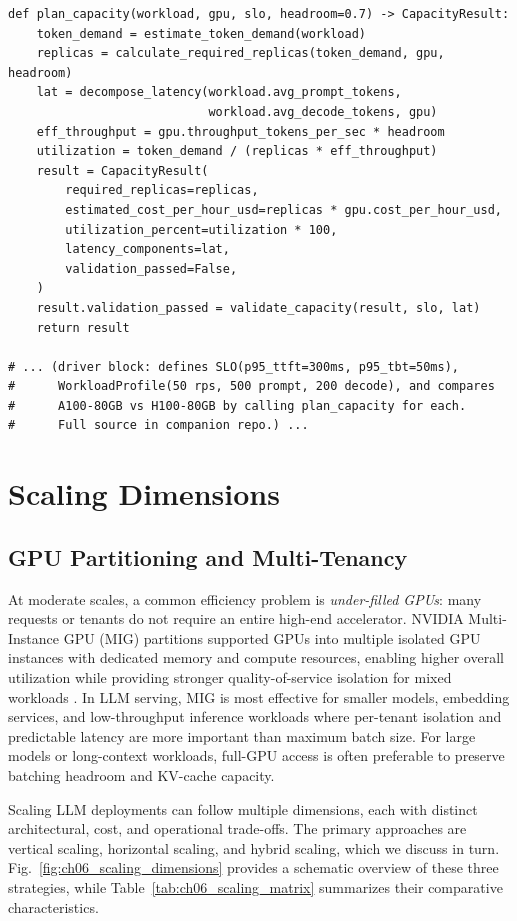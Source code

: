 \begin{codebox}
\begin{verbatim}
def plan_capacity(workload, gpu, slo, headroom=0.7) -> CapacityResult:
    token_demand = estimate_token_demand(workload)
    replicas = calculate_required_replicas(token_demand, gpu, headroom)
    lat = decompose_latency(workload.avg_prompt_tokens,
                            workload.avg_decode_tokens, gpu)
    eff_throughput = gpu.throughput_tokens_per_sec * headroom
    utilization = token_demand / (replicas * eff_throughput)
    result = CapacityResult(
        required_replicas=replicas,
        estimated_cost_per_hour_usd=replicas * gpu.cost_per_hour_usd,
        utilization_percent=utilization * 100,
        latency_components=lat,
        validation_passed=False,
    )
    result.validation_passed = validate_capacity(result, slo, lat)
    return result

# ... (driver block: defines SLO(p95_ttft=300ms, p95_tbt=50ms),
#      WorkloadProfile(50 rps, 500 prompt, 200 decode), and compares
#      A100-80GB vs H100-80GB by calling plan_capacity for each.
#      Full source in companion repo.) ...
\end{verbatim}
\end{codebox}

\section{Scaling Dimensions}
\label{sec:scaling-dimensions}
\subsection{GPU Partitioning and Multi-Tenancy}\label{sec:gpu-partitioning}
At moderate scales, a common efficiency problem is \emph{under-filled GPUs}: many requests or tenants do not require an entire high-end accelerator. NVIDIA Multi-Instance GPU (MIG) partitions supported GPUs into multiple isolated GPU instances with dedicated memory and compute resources, enabling higher overall utilization while providing stronger quality-of-service isolation for mixed workloads \cite{nvidia_mig_guide}. In LLM serving, MIG is most effective for smaller models, embedding services, and low-throughput inference workloads where per-tenant isolation and predictable latency are more important than maximum batch size. For large models or long-context workloads, full-GPU access is often preferable to preserve batching headroom and KV-cache capacity.

Scaling LLM deployments can follow multiple dimensions, each with distinct architectural, cost, and operational trade-offs. The primary approaches are vertical scaling, horizontal scaling, and hybrid scaling, which we discuss in turn. Fig.~\ref{fig:ch06_scaling_dimensions} provides a schematic overview of these three strategies, while Table~\ref{tab:ch06_scaling_matrix} summarizes their comparative characteristics.

